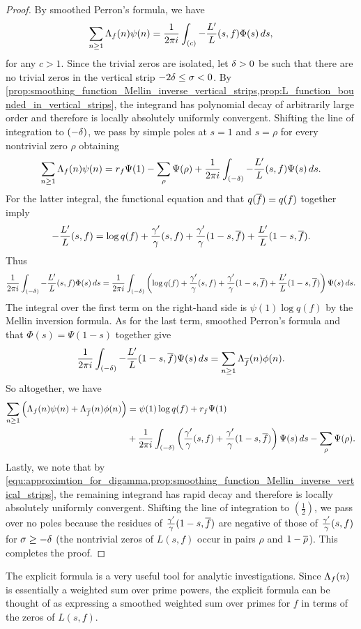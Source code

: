     \begin{proof}
      By smoothed Perron's formula, we have
      \[
        \sum_{n \ge 1}\Lambda_{f}(n)\psi(n) = \frac{1}{2\pi i}\int_{(c)}-\frac{L'}{L}(s,f)\Phi(s)\,ds,
      \]
      for any $c > 1$. Since the trivial zeros are isolated, let $\delta > 0$ be such that there are no trivial zeros in the vertical strip $-2\delta \le \sigma < 0$. By \cref{prop:smoothing_function_Mellin_inverse_vertical_strips,prop:L_function_bounded_in_vertical_strips}, the integrand has polynomial decay of arbitrarily large order and therefore is locally absolutely uniformly convergent. Shifting the line of integration to $(-\delta)$, we pass by simple poles at $s = 1$ and $s = \rho$ for every nontrivial zero $\rho$ obtaining
      \[
        \sum_{n \ge 1}\Lambda_{f}(n)\psi(n) = r_{f}\Psi(1)-\sum_{\rho}\Psi(\rho)+\frac{1}{2\pi i}\int_{(-\delta)}-\frac{L'}{L}(s,f)\Psi(s)\,ds.
      \]
      For the latter integral, the functional equation and that $q(\overline{f}) = q(f)$ together imply
      \[
        -\frac{L'}{L}(s,f) = \log{q(f)}+\frac{\gamma'}{\gamma}(s,f)+\frac{\gamma'}{\gamma}(1-s,\overline{f})+\frac{L'}{L}(1-s,\overline{f}).
      \]
      Thus
      \[
        \frac{1}{2\pi i}\int_{(-\delta)}-\frac{L'}{L}(s,f)\Phi(s)\,ds = \frac{1}{2\pi i}\int_{(-\delta)}\left(\log{q(f)}+\frac{\gamma'}{\gamma}(s,f)+\frac{\gamma'}{\gamma}(1-s,\overline{f})+\frac{L'}{L}(1-s,\overline{f})\right)\Psi(s)\,ds.
      \]
      The integral over the first term on the right-hand side is $\psi(1)\log{q(f)}$ by the Mellin inversion formula. As for the last term, smoothed Perron's formula and that $\Phi(s) = \Psi(1-s)$ together give
      \[
        \frac{1}{2\pi i}\int_{(-\delta)}-\frac{L'}{L}(1-s,\overline{f})\Psi(s)\,ds = \sum_{n \ge 1}\Lambda_{\overline{f}}(n)\phi(n).
      \]
      So altogether, we have
      \begin{align*}
        \sum_{n \ge 1}\left(\Lambda_{f}(n)\psi(n)+\Lambda_{\overline{f}}(n)\phi(n)\right) &= \psi(1)\log{q(f)}+r_{f}\Psi(1) \\
        &+ \frac{1}{2\pi i}\int_{(-\delta)}\left(\frac{\gamma'}{\gamma}(s,f)+\frac{\gamma'}{\gamma}(1-s,\overline{f})\right)\Psi(s)\,ds-\sum_{\rho}\Psi(\rho).
      \end{align*}
      Lastly, we note that by \cref{equ:approximtion_for_digamma,prop:smoothing_function_Mellin_inverse_vertical_strips}, the remaining integrand has rapid decay and therefore is locally absolutely uniformly convergent. Shifting the line of integration to $\left(\frac{1}{2}\right)$, we pass over no poles because the residues of $\frac{\gamma'}{\gamma}(1-s,\overline{f})$ are negative of those of $\frac{\gamma'}{\gamma}(s,f)$ for $\sigma \ge -\delta$ (the nontrivial zeros of $L(s,f)$ occur in pairs $\rho$ and $1-\overline{\rho}$). This completes the proof. 
    \end{proof}

    The explicit formula is a very useful tool for analytic investigations. Since $\Lambda_{f}(n)$ is essentially a weighted sum over prime powers, the explicit formula can be thought of as expressing a smoothed weighted sum over primes for $f$ in terms of the zeros of $L(s,f)$.